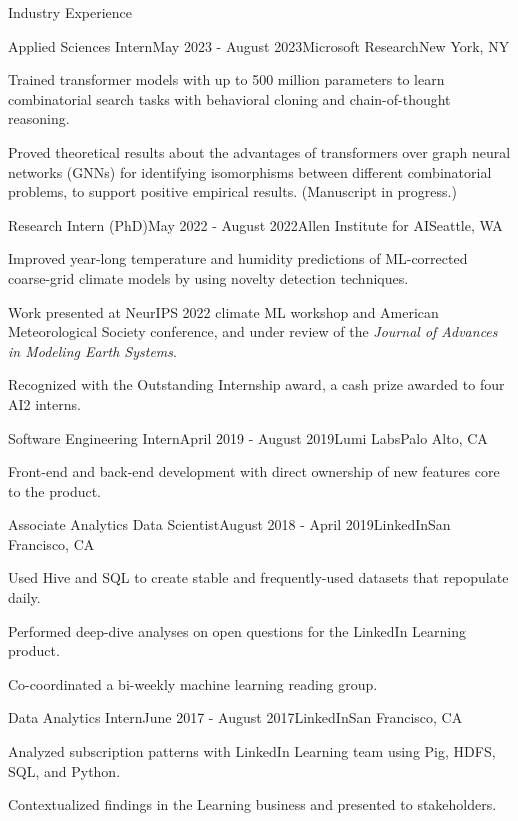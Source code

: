 \documentclass{cv} %
\begin{document}
\begin{rSection}{Industry Experience}

\begin{rSubsection}{Applied Sciences Intern}{May 2023 - August 2023}{Microsoft Research}{New York, NY}
\item Trained transformer models with up to 500 million parameters to learn combinatorial search tasks with behavioral cloning and chain-of-thought reasoning.
\item Proved theoretical results about the advantages of transformers over graph neural networks (GNNs) for identifying isomorphisms between different combinatorial problems, to support positive empirical results. (Manuscript in progress.) 
\end{rSubsection}

\begin{rSubsection}{Research Intern (PhD)}{May 2022 - August 2022}{Allen Institute for AI}{Seattle, WA}
\item Improved year-long temperature and humidity predictions of ML-corrected coarse-grid climate models by using novelty detection techniques.
\item Work presented at NeurIPS 2022 climate ML workshop and American Meteorological Society conference, and under review of the \textit{Journal of Advances in Modeling Earth Systems}.
\item Recognized with the Outstanding Internship award, a cash prize awarded to four AI2 interns.
\end{rSubsection}

\begin{rSubsection}{Software Engineering Intern}{April 2019 - August 2019}{Lumi Labs}{Palo Alto, CA}
\item Front-end and back-end development with direct ownership of new features core to the product.
\end{rSubsection}

\begin{rSubsection}{Associate Analytics Data Scientist}{August 2018 - April 2019}{LinkedIn}{San Francisco, CA}
\item Used Hive and SQL to create stable and frequently-used datasets that repopulate daily. 
\item Performed deep-dive analyses on open questions for the LinkedIn Learning product.
\item Co-coordinated a bi-weekly machine learning reading group.
\end{rSubsection}

\begin{rSubsection}{Data Analytics Intern}{June 2017 - August 2017}{LinkedIn}{San Francisco, CA}
\item Analyzed subscription patterns with LinkedIn Learning team using Pig, HDFS, SQL, and Python.
\item Contextualized findings in the Learning business and presented to stakeholders.
\end{rSubsection}

\end{rSection}
\end{document}
